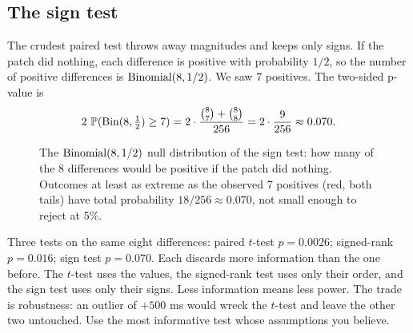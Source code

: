 \subsection{The sign test}

The crudest paired test throws away magnitudes and keeps only signs. If the
patch did nothing, each difference is positive with probability $1/2$, so the
number of positive differences is $\Bin(8, 1/2)$. We saw 7 positives. The
two-sided p-value is
\[
  2\,\P(\text{Bin}(8,\tfrac12) \ge 7) = 2 \cdot \frac{\binom{8}{7}+\binom{8}{8}}{256}
  = 2\cdot\frac{9}{256} \approx 0.070.
\]

\begin{figure}[H]
\centering
{}
\caption{The $\Bin(8,1/2)$ null distribution of the sign test: how many of the
8 differences would be positive if the patch did nothing. Outcomes at least as
extreme as the observed 7 positives (red, both tails) have total probability
$18/256 \approx 0.070$, not small enough to reject at 5\%.}
\label{fig:cg-signtest}
\end{figure}

\begin{happeningbox}
Three tests on the same eight differences:
paired $t$-test $p = 0.0026$; signed-rank $p = 0.016$; sign test $p = 0.070$.
Each discards more information than the one before. The $t$-test uses the
values, the signed-rank test uses only their order, and the sign test uses only
their signs. Less information means less power. The trade is robustness: an
outlier of $+500$ ms would wreck the $t$-test and leave the other two untouched.
Use the most informative test whose assumptions you believe.
\end{happeningbox}

